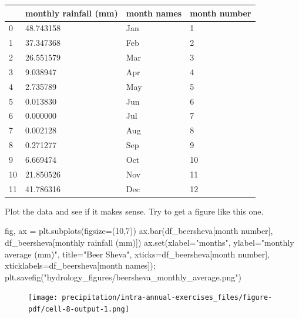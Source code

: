 \documentclass[
  letterpaper,
  DIV=11,
  numbers=noendperiod]{scrreprt}
\newenvironment{Shaded}{\begin{snugshade}}{\end{snugshade}}
\newcommand{\BuiltInTok}[1]{\textcolor[rgb]{0.00,0.23,0.31}{#1}}
\newcommand{\DecValTok}[1]{\textcolor[rgb]{0.68,0.00,0.00}{#1}}
\newcommand{\NormalTok}[1]{\textcolor[rgb]{0.00,0.23,0.31}{#1}}
\newcommand{\OperatorTok}[1]{\textcolor[rgb]{0.37,0.37,0.37}{#1}}
\newcommand{\StringTok}[1]{\textcolor[rgb]{0.13,0.47,0.30}{#1}}
\begin{document}
\begin{longtable}[]{@{}llll@{}}
\toprule()
& monthly rainfall (mm) & month names & month number \\
\midrule()
\endhead
0 & 48.743158 & Jan & 1 \\
1 & 37.347368 & Feb & 2 \\
2 & 26.551579 & Mar & 3 \\
3 & 9.038947 & Apr & 4 \\
4 & 2.735789 & May & 5 \\
5 & 0.013830 & Jun & 6 \\
6 & 0.000000 & Jul & 7 \\
7 & 0.002128 & Aug & 8 \\
8 & 0.271277 & Sep & 9 \\
9 & 6.669474 & Oct & 10 \\
10 & 21.850526 & Nov & 11 \\
11 & 41.786316 & Dec & 12 \\
\bottomrule()
\end{longtable}

Plot the data and see if it makes sense. Try to get a figure like this
one.

\begin{Shaded}
\begin{Highlighting}[]
\NormalTok{fig, ax }\OperatorTok{=}\NormalTok{ plt.subplots(figsize}\OperatorTok{=}\NormalTok{(}\DecValTok{10}\NormalTok{,}\DecValTok{7}\NormalTok{))}
\NormalTok{ax.bar(df\_beersheva[}\StringTok{\textquotesingle{}month number\textquotesingle{}}\NormalTok{], df\_beersheva[}\StringTok{\textquotesingle{}monthly rainfall (mm)\textquotesingle{}}\NormalTok{])}
\NormalTok{ax.}\BuiltInTok{set}\NormalTok{(xlabel}\OperatorTok{=}\StringTok{"months"}\NormalTok{,}
\NormalTok{       ylabel}\OperatorTok{=}\StringTok{"monthly average (mm)"}\NormalTok{,}
\NormalTok{       title}\OperatorTok{=}\StringTok{"Beer Sheva"}\NormalTok{,}
\NormalTok{       xticks}\OperatorTok{=}\NormalTok{df\_beersheva[}\StringTok{\textquotesingle{}month number\textquotesingle{}}\NormalTok{],}
\NormalTok{       xticklabels}\OperatorTok{=}\NormalTok{df\_beersheva[}\StringTok{\textquotesingle{}month names\textquotesingle{}}\NormalTok{])}\OperatorTok{;}
\NormalTok{plt.savefig(}\StringTok{"hydrology\_figures/beersheva\_monthly\_average.png"}\NormalTok{)}
\end{Highlighting}
\end{Shaded}

\begin{figure}[H]

{\centering \texttt{[image: precipitation/intra-annual-exercises\_files/figure-pdf/cell-8-output-1.png]}

}

\end{figure}
\end{document}
